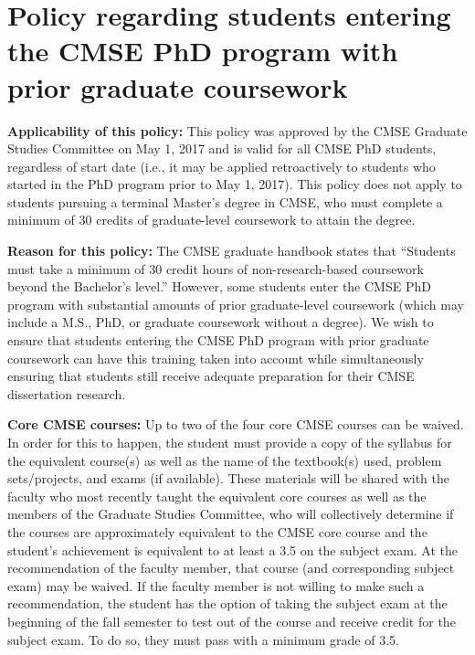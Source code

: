 \section{Policy regarding students entering the CMSE PhD program with prior graduate coursework}
\label{sec:prior_coursework}

\vspace{4mm}
\noindent
\textbf{Applicability of this policy:} This policy was
approved by the CMSE Graduate Studies Committee on May 1, 2017 and is
valid for all CMSE PhD students, regardless of start date (i.e., it
may be applied retroactively to students who started in the PhD
program prior to May 1, 2017).  This policy does not apply to students
pursuing a terminal Master's degree in CMSE, who must complete a
minimum of 30 credits of graduate-level coursework to attain the
degree.

\vspace{2mm}
\noindent
\textbf{Reason for this policy:} The CMSE graduate handbook states
that “Students must take a minimum of 30 credit hours of
non-research-based coursework beyond the Bachelor’s level.”  However,
some students enter the CMSE PhD program with substantial amounts of
prior graduate-level coursework (which may include a M.S., PhD, or
graduate coursework without a degree).  We wish to ensure that
students entering the CMSE PhD program with prior graduate coursework
can have this training taken into account while simultaneously
ensuring that students still receive adequate preparation for their
CMSE dissertation research.

\vspace{2mm}
\noindent
\textbf{Core CMSE courses:} Up to two of the four core CMSE courses
can be waived.  In order for this to happen, the student must provide
a copy of the syllabus for the equivalent course(s) as well as the
name of the textbook(s) used, problem sets/projects, and exams (if
available).  These materials will be shared with the faculty who most
recently taught the equivalent core courses as well as the members of
the Graduate Studies Committee, who will collectively determine if the
courses are approximately equivalent to the CMSE core course and the
student’s achievement is equivalent to at least a 3.5 on the subject
exam.  At the recommendation of the faculty member, that course (and
corresponding subject exam) may be waived.  If the faculty member is
not willing to make such a recommendation, the student has the option
of taking the subject exam at the beginning of the fall semester to
test out of the course and receive credit for the subject exam.  To do
so, they must pass with a minimum grade of 3.5.

